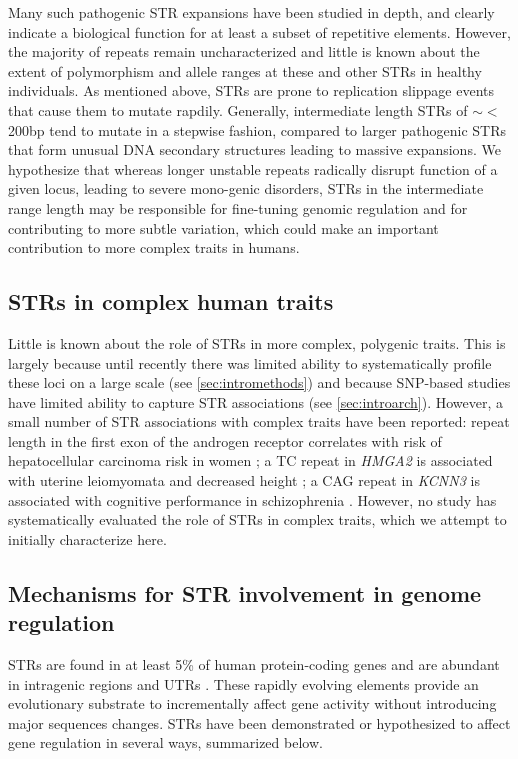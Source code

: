 Many such pathogenic STR expansions have been studied in depth, and clearly indicate a biological function for at least a subset of repetitive elements. However, the majority of repeats remain uncharacterized and little is known about the extent of polymorphism and allele ranges at these and other STRs in healthy individuals. As mentioned above, STRs are prone to replication slippage events that cause them to mutate rapdily. Generally, intermediate length STRs of $\sim<$200bp tend to mutate in a stepwise fashion, compared to larger pathogenic STRs that form unusual DNA secondary structures leading to massive expansions. We hypothesize that whereas longer unstable repeats radically disrupt function of a given locus, leading to severe mono-genic disorders, STRs in the intermediate range length may be responsible for fine-tuning genomic regulation and for contributing to more subtle variation, which could make an important contribution to more complex traits in humans.

\subsection{STRs in complex human traits}
Little is known about the role of STRs in more complex, polygenic traits. This is largely because until recently there was limited ability to systematically profile these loci on a large scale (see \ref{sec:intromethods}) and because SNP-based studies have limited ability to capture STR associations (see \ref{sec:introarch}). However, a small number of STR associations with complex traits have been reported: repeat length in the first exon of the androgen receptor correlates with risk of hepatocellular carcinoma risk in women \cite{YuYangYangEtAl2002}; a TC repeat in \emph{HMGA2} is associated with uterine leiomyomata and decreased height \cite{HodgeTCuencoHuyckEtAl2009}; a CAG repeat in \emph{KCNN3} is associated with cognitive performance in schizophrenia \cite{GrubeGerchenAdamcioEtAl2011}. However, no study has systematically evaluated the role of STRs in complex traits, which we attempt to initially characterize here.

\subsection{Mechanisms for STR involvement in genome regulation}
STRs are found in at least 5\% of human protein-coding genes \cite{ODushlaineEdwardsParkEtAl2005} and are abundant in intragenic regions and UTRs \cite{LiKorolFahimaEtAl2004}. These rapidly evolving elements provide an evolutionary substrate to incrementally affect gene activity without introducing major sequences changes. STRs have been demonstrated or hypothesized to affect gene regulation in several ways, summarized below. %

